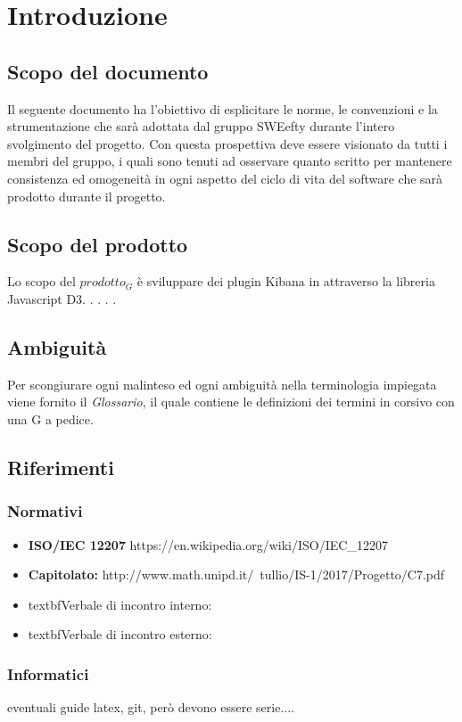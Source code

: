 \section{Introduzione}

\subsection{Scopo del documento}
Il seguente documento ha l'obiettivo di esplicitare le norme, le convenzioni e la strumentazione che sarà adottata dal gruppo SWEefty durante l'intero svolgimento del progetto. Con questa prospettiva deve essere visionato da tutti i membri del gruppo, i quali sono tenuti ad osservare quanto scritto per mantenere consistenza ed omogeneità in ogni aspetto del ciclo di vita del software che sarà prodotto durante il progetto.
\subsection{Scopo del prodotto}
Lo scopo del $prodotto_G$ è sviluppare dei plugin Kibana in attraverso la libreria Javascript D3.
.
.
.
.

\subsection{Ambiguità}
Per scongiurare ogni malinteso ed ogni ambiguità nella terminologia impiegata viene fornito il \textit{Glossario}, il quale contiene le definizioni dei termini in corsivo con una G a pedice.

\subsection{Riferimenti}
	\subsubsection{Normativi}
		\begin{itemize}
			\item \textbf{ISO/IEC 12207} https://en.wikipedia.org/wiki/ISO/IEC_12207
			\item \textbf{Capitolato:} http://www.math.unipd.it/~tullio/IS-1/2017/Progetto/C7.pdf
			\item textbf{Verbale di incontro interno:}
			\item textbf{Verbale di incontro esterno:}		
		\end{itemize}
	\subsubsection{Informatici}
	eventuali guide latex, git, però devono essere serie....